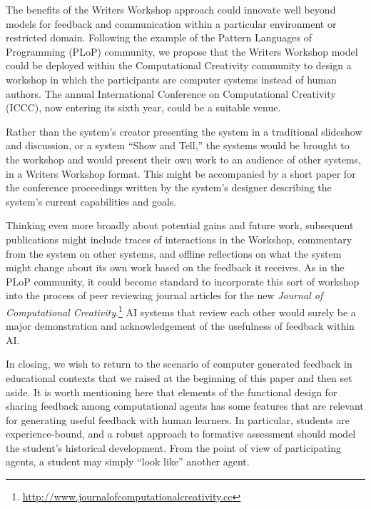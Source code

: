 
The benefits of the Writers Workshop approach could innovate well beyond models for 
feedback and communication within a particular environment or restricted domain. 
Following the example of the Pattern Languages of Programming (PLoP) community, we propose that the Writers Workshop model could be deployed
within the Computational Creativity community to design a workshop in
which the participants are computer systems instead of human authors.
The annual International Conference on Computational Creativity
(ICCC), now entering its sixth year, could be a suitable venue. 

Rather than the system's creator presenting the system in a
traditional slideshow and discussion, or a system ``Show and Tell,''
the systems would be brought to the workshop and would present their
own work to an audience of other systems, in a Writers Workshop
format.  This might be accompanied by a short paper for the conference
proceedings written by the system's designer describing the system's
current capabilities and goals.  

Thinking even more broadly about potential gains and future work, subsequent publications might include
traces of interactions in the Workshop, commentary from the system on
other systems, and offline reflections on what the system might change
about its own work based on the feedback it receives.  As in the PLoP
community, it could become standard to incorporate this sort of workshop
into the process of peer reviewing journal articles for the new \emph{Journal of
  Computational Creativity}.\footnote{\url{http://www.journalofcomputationalcreativity.cc}} AI systems that review each other would surely be a major demonstration and acknowledgement of the usefulness of feedback within AI.

In closing, we wish to return to the scenario of computer generated
feedback in educational contexts that we raised at the beginning of
this paper and then set aside.  It is worth mentioning here that
elements of the functional design for sharing feedback among
computational agents has some features that are relevant for
generating useful feedback with human learners.  In particular,
students are experience-bound, and a robust approach to formative
assessment should model the student's historical development.  From
the point of view of participating agents, a student may simply ``look
like'' another agent.
